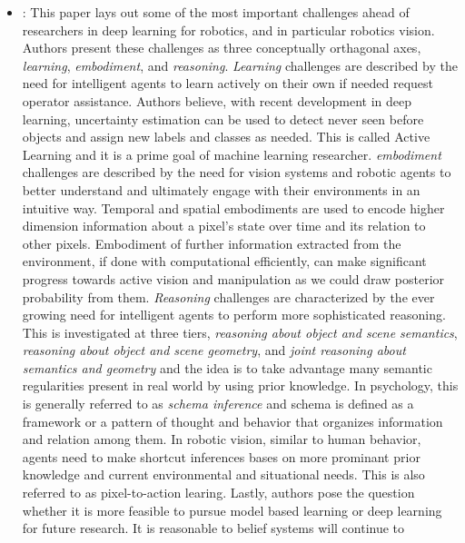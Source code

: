 \documentclass[11pt]{article}
\begin{document}
\begin{itemize}
	\item \cite{sunderhauf2018limits}: This paper lays out some of the most important
	      challenges ahead of researchers in deep learning for robotics, and in
	      particular robotics vision. Authors present these challenges as three conceptually
	      orthagonal axes, \textit{learning}, \textit{embodiment}, and \textit{reasoning}.
	      \textit{Learning} challenges are described by the need for intelligent agents
	      to learn actively on their own if needed request operator assistance.
	      Authors believe, with recent development in deep learning, uncertainty
	      estimation can be used to detect never seen before objects and assign
	      new labels and classes as needed. This is called Active Learning and
	      it is a prime goal of machine learning researcher. \textit{embodiment}
	      challenges are described by the need for vision systems and robotic
	      agents to better understand and ultimately engage with their environments
	      in an intuitive way. Temporal and spatial embodiments are used to encode
	      higher dimension information about a pixel's state over time and its
	      relation to other pixels. Embodiment of further information extracted
	      from the environment, if done with computational efficiently, can make
	      significant progress towards active vision and manipulation as we could
	      draw posterior probability from them. \textit{Reasoning} challenges
	      are characterized by the ever growing need for intelligent agents to
	      perform more sophisticated reasoning. This is investigated at three
	      tiers, \textit{reasoning about object and scene semantics},
	      \textit{reasoning about object and scene geometry}, and \textit{joint
		      reasoning about semantics and geometry} and the idea is to take
	      advantage many semantic regularities present in real world by using
	      prior knowledge. In psychology, this is generally referred to as
	      \textit{schema inference} and schema is defined as a framework or a
	      pattern of thought and behavior that organizes information and relation
	      among them. In robotic vision, similar to human behavior, agents need
	      to make shortcut inferences bases on more prominant prior knowledge and
	      current environmental and situational needs. This is also referred to
	      as pixel-to-action learing. Lastly, authors pose the question whether
	      it is more feasible to pursue model based learning or deep learning for
	      future research. It is reasonable to belief systems will continue to

\end{itemize}
\end{document}
